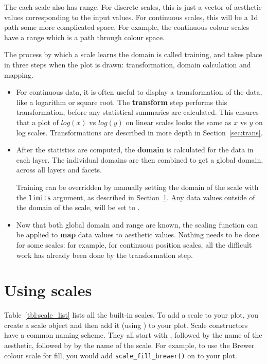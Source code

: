 The each scale also has range.  For discrete scales, this is just a vector of aesthetic values corresponding to the input values.  For continuous scales, this will be a 1d path some more complicated space.  For example, the continuous colour scales have a range which is a path through colour space.

The process by which a scale learns the domain is called training, and takes place in three steps when the plot is drawn: transformation, domain calculation and mapping.  

\begin{itemize}
	\item  For continuous data, it is often useful to display a transformation of the data, like a logarithm or square root.  The {\bf transform} step performs this transformation, before any statistical summaries are calculated.  This ensures that a plot of $log(x)$ vs $log(y)$ on linear scales looks the same as $x$ vs $y$ on log scales.  Transformations are described in more depth in Section~\ref{sec:trans}. 

	\item After the statistics are computed, the {\bf domain} is calculated for the data in each layer.  The individual domains are then combined to get a global domain, across all layers and facets.  
	
	Training can be overridden by manually setting the domain of the scale with the {\tt limits} argument, as described in Section~\ref{sec:scale-usage}.  Any data values outside of the domain of the scale, will be set to .

	\item Now that both global domain and range are known, the scaling function can be applied to {\bf map} data values to aesthetic values.  Nothing needs to be done for some scales: for example, for continuous position scales, all the difficult work has already been done by the transformation step.
	
\end{itemize}

\section{Using scales}
\label{sec:scale-usage}

Table~\ref{tbl:scale_list} lists all the built-in scales.  To add a scale to your plot, you create a scale object and then add it (using \code{+}) to your plot. Scale constructors have a common naming scheme.  They all start with , followed by the name of the aesthetic, followed by by the name of the scale. For example, to use the Brewer colour scale for fill, you would add {\tt scale\_fill\_brewer()} on to your plot.  

